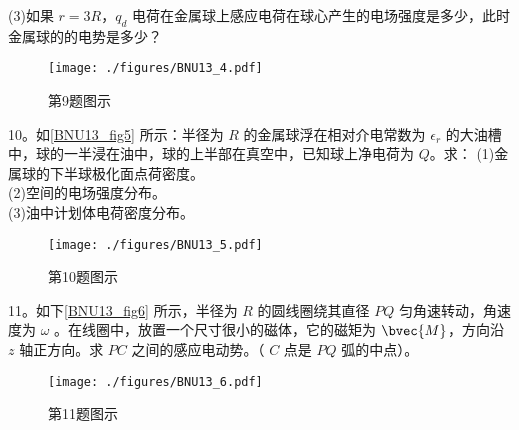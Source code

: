 (3)如果 $r=3R$，$q_d$ 电荷在金属球上感应电荷在球心产生的电场强度是多少，此时金属球的的电势是多少？
\begin{figure}[ht]
\centering
\texttt{[image: ./figures/BNU13\_4.pdf]}
\caption{第9题图示} \label{BNU13_fig4}
\end{figure}
10。如\autoref{BNU13_fig5} 所示：半径为 $R$ 的金属球浮在相对介电常数为 $\epsilon_r$ 的大油槽中，球的一半浸在油中，球的上半部在真空中，已知球上净电荷为 $Q$。求：
(1)金属球的下半球极化面点荷密度。\\
(2)空间的电场强度分布。\\
(3)油中计划体电荷密度分布。
\begin{figure}[ht]
\centering
\texttt{[image: ./figures/BNU13\_5.pdf]}
\caption{第10题图示} \label{BNU13_fig5}
\end{figure}
11。如下\autoref{BNU13_fig6} 所示，半径为 $R$ 的圆线圈绕其直径 $PQ$ 匀角速转动，角速度为 $\omega$ 。在线圈中，放置一个尺寸很小的磁体，它的磁矩为 $
\bvec{M}$，方向沿 $z$ 轴正方向。求 $PC$ 之间的感应电动势。（ $C$ 点是 $PQ$ 弧的中点）。
\begin{figure}[ht]
\centering
\texttt{[image: ./figures/BNU13\_6.pdf]}
\caption{第11题图示} \label{BNU13_fig6}
\end{figure}